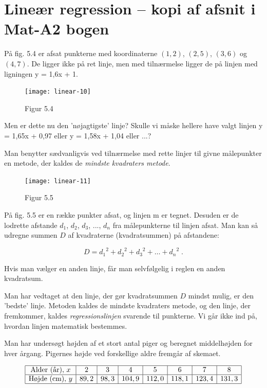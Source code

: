 \documentclass[12pt,oneside,a4paper]{article}
\begin{document}
\section{Lineær regression -- kopi af afsnit i Mat-A2 bogen}
På fig. 5.4 er afsat punkterne med koordinaterne $(1, 2)$, $(2, 5)$, $(3, 6)$ og $(4,
7)$. De ligger ikke på ret linje, men med tilnærmelse ligger de på linjen med
ligningen y = 1,6x + 1.

\begin{figure}[ht]
    \centering
    \texttt{[image: linear-10]}
    \caption{Figur 5.4}
    \label{fig54}
\end{figure}

Men er dette nu den 'nøjagtigste' linje? Skulle vi måske hellere have valgt
linjen y = 1,65x + 0,97 eller y = 1,58x + 1,04 eller ...?

Man benytter sædvanligvis ved tilnærmelse med rette linjer til givne
målepunkter en metode, der kaldes de {\em mindste kvadraters metode}.

\begin{figure}[ht]
    \centering
    \texttt{[image: linear-11]}
    \caption{Figur 5.5}
    \label{fig55}
\end{figure}

På fig. 5.5 er en række punkter afsat, og linjen m er tegnet. Desuden er de
lodrette afstande $d_1$, $d_2$, $d_3$, ..., $d_n$ fra målepunkterne til linjen afsat. Man
kan så udregne summen $D$ af kvadraterne (kvadratsummen) på afstandene:

$$
D = {d_1}^2 + {d_2}^2 + {d_3}^2 + \ldots + {d_n}^2 \; . 
$$

Hvis man vælger en anden linje, får man selvfølgelig i reglen en anden kvadratsum.

Man har vedtaget at den linje, der gør kvadratsummen $D$ mindst mulig, er den
'bedste' linje. Metoden kaldes de mindste kvadraters metode, og den linje, der
fremkommer, kaldes {\em regressionslinjen} svarende til punkterne. Vi går ikke ind
på, hvordan linjen matematisk bestemmes. 


Man har undersøgt højden af et stort antal piger og beregnet middel\-høj\-den for
hver årgang. Pigernes højde ved forskellige aldre fremgår af skemaet.

$$
\begin{array}{|c|c|c|c|c|c|c|c|}
    \hline
    \mbox{Alder (år)},\, x &  2 &  3 &  4 &  5 &  6 &  7 &  8 \\
    \hline
    \mbox{Højde (cm)},\, y &  89,2 &   98,3 &   104,9 &  112,0 &  118,1 &  123,4 &  131,3 \\
    \hline
\end{array}
$$
\end{document}

